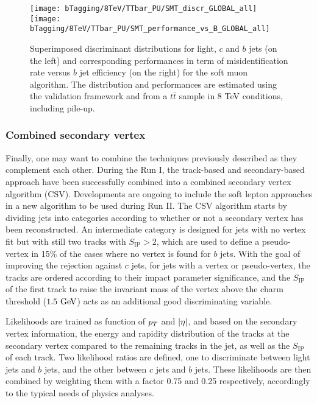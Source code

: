     \begin{figure}[th!]
        \centering
        \begin{minipage}{\textwidth}
        \texttt{[image: bTagging/8TeV/TTbar\_PU/SMT\_discr\_GLOBAL\_all]}
        \texttt{[image: bTagging/8TeV/TTbar\_PU/SMT\_performance\_vs\_B\_GLOBAL\_all]}
        \end{minipage}
        \caption{Superimposed discriminant distributions for light, $c$ and $b$ jets (on
        the left) and corresponding performances in term of misidentification rate versus $b$ jet efficiency
        (on the right) for the soft muon algorithm.
        The distribution and performances are estimated using the validation framework and from
        a $t\bar{t}$ sample in 8 TeV conditions, including pile-up.}
        \label{fig:bTagging/perfSMT}
    \end{figure}

        \subsubsection{Combined secondary vertex}

    Finally, one may want to combine the techniques previously described as they
    complement each other. During the Run I, the track-based and secondary-based
    approach have been successfully combined into a combined secondary vertex
    algorithm (CSV). Developments are ongoing to include the soft lepton
    approaches in a new algorithm to be used during Run II.  The CSV algorithm
    starts by dividing jets into categories according to whether or not a
    secondary vertex has been reconstructed. An intermediate category is
    designed for jets with no vertex fit but with still two tracks with
    $S_\text{IP} > 2$, which are used to define a pseudo-vertex in 15\% of the
    cases where no vertex is found for $b$ jets.  With the goal of improving the
    rejection against $c$ jets, for jets with a vertex or pseudo-vertex, the
    tracks are ordered according to their impact parameter significance, and the
    $S_\text{IP}$ of the first track to raise the invariant mass of the vertex
    above the charm threshold ($1.5 ~\text{GeV}$) acts as an additional good
    discriminating variable.

    Likelihoods are trained as function of $p_T$ and $\left| \eta \right|$, and based on the
    secondary vertex information, the energy and rapidity distribution of the
    tracks at the secondary vertex compared to the remaining tracks in the jet,
    as well as the $S_\text{IP}$ of each track. Two likelihood ratios are
    defined, one to discriminate between light jets and $b$ jets, and the other
    between $c$ jets and $b$ jets.  These likelihoods are then combined by
    weighting them with a factor 0.75 and 0.25 respectively, accordingly to the
    typical needs of physics analyses.

